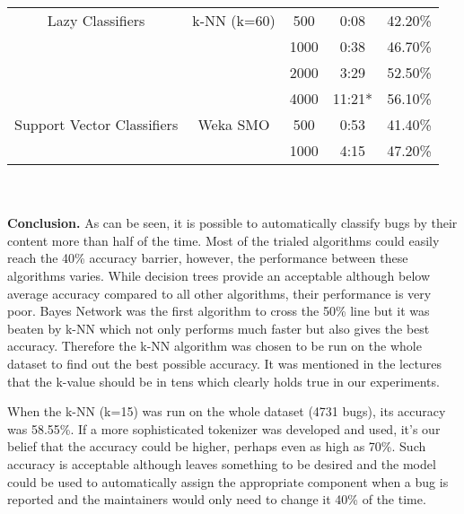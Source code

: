 \begin{tabular}{|c|c|c|c|c|}
Lazy Classifiers & k-NN (k=60) &   500  &   0:08  &    42.20\%  \\
                              &&  1000  &   0:38  &    46.70\%  \\
                              &&  2000  &   3:29  &    52.50\%  \\
                              &&  4000  &  11:21* &    56.10\%  \\

Support Vector Classifiers & Weka SMO &   500  &  0:53  &    41.40\%  \\
                                     &&  1000  &  4:15  &    47.20\%  \\
\hline
\end{tabular}
\\
\\

{\bf Conclusion.} As can be seen, it is possible to automatically classify bugs by their content more than half of the time. Most of the trialed algorithms could easily reach the 40\% accuracy barrier, however, the performance between these algorithms varies. While decision trees provide an acceptable although below average accuracy compared to all other algorithms, their performance is very poor. Bayes Network was the first algorithm to cross the 50\% line but it was beaten by k-NN which not only performs much faster but also gives the best accuracy. Therefore the k-NN algorithm was chosen to be run on the whole dataset to find out the best possible accuracy. It was mentioned in the lectures that the k-value should be in tens which clearly holds true in our experiments.

When the k-NN (k=15) was run on the whole dataset (4731 bugs), its accuracy was 58.55\%. If a more sophisticated tokenizer was developed and used, it's our belief that the accuracy could be higher, perhaps even as high as 70\%. Such accuracy is acceptable although leaves something to be desired and the model could be used to automatically assign the appropriate component when a bug is reported and the maintainers would only need to change it 40\% of the time.




